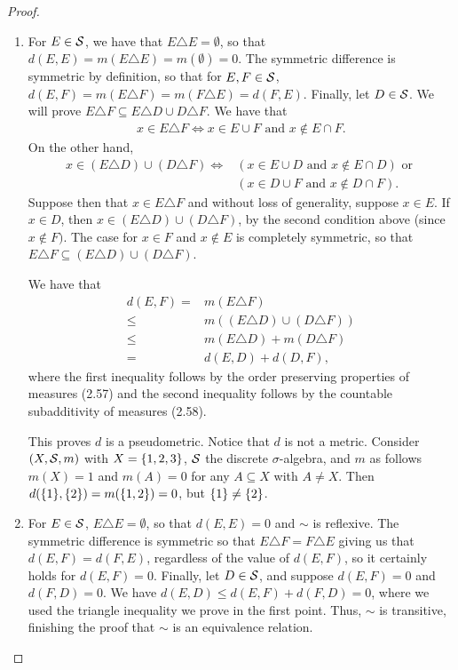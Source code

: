 \begin{proof}
\begin{enumerate}
    \item For $E \in \mathcal{S}$, we have that $E \triangle E = \emptyset$, so that $d(E, E) = m(E \triangle E) = m(\emptyset) = 0$.
    The symmetric difference is symmetric by definition, so that for $E, F \in \mathcal{S}$, $d(E, F) = m(E \triangle F) = m(F \triangle E) = d(F, E)$.
    Finally, let $D \in \mathcal{S}$.
    We will prove $E \triangle F \subseteq E \triangle D \cup D \triangle F$.
    We have that
    \begin{align*}
        x \in E \triangle F \iff x \in E \cup F \text{ and } x \notin E \cap F.
    \end{align*}
    On the other hand,
    \begin{align*}
        x \in (E \triangle D) \cup (D \triangle F) 
        \iff& (x \in E \cup D \text{ and } x \notin E \cap D) \text{ or }\\
        &(x \in D \cup F \text{ and } x \notin D \cap F).
    \end{align*}
    Suppose then that $x \in E \triangle F$ and without loss of generality, suppose $x \in E$.
    If $x \in D$, then  $x \in (E \triangle D) \cup (D \triangle F)$, by the second condition above (since $x \notin F)$.
    The case for $x \in F$ and $x \notin E$ is completely symmetric, so that $E \triangle F \subseteq (E \triangle D) \cup (D \triangle F)$. 
    
    We have that 
    \begin{align*}
        d(E, F) 
        =& m(E \triangle F) \\
        \leq& m((E \triangle D) \cup (D \triangle F))\\
        \leq& m(E \triangle D) + m(D \triangle F)\\
        =& d(E, D) + d(D, F),
    \end{align*}
    where the first inequality follows by the order preserving properties of measures (2.57) and the second inequality follows by the countable subadditivity of measures (2.58).

    This proves $d$ is a pseudometric.
    Notice that $d$ is not a metric.
    Consider $(X, \mathcal{S}, m)$ with $X = \{1,2, 3\}$, $\mathcal{S}$ the discrete $\sigma$-algebra, and $m$ as follows $m(X) = 1$ and $m(A) = 0$ for any $A \subseteq X$ with $A \neq X$.
    Then $d(\{1\}, \{2\}) = m(\{1, 2\}) = 0$, but $\{1\} \neq \{2\}$.
    
    \item For $E \in \mathcal{S}$, $E \triangle E = \emptyset$, so that $d(E, E) = 0$ and $\sim$ is reflexive. 
    The symmetric difference is symmetric so that $E \triangle F = F \triangle E$ giving us that $d(E, F) = d(F, E)$, regardless of the value of $d(E, F)$, so it certainly holds for $d(E, F) = 0$.
    Finally, let $D \in \mathcal{S}$, and suppose $d(E, F) = 0$ and $d(F, D) = 0$.
    We have $d(E, D) \leq d(E, F) + d(F, D) = 0$, where we used the triangle inequality we prove in the first point.
    Thus, $\sim$ is transitive, finishing the proof that $\sim$ is an equivalence relation.
    

\end{enumerate}
\end{proof}
